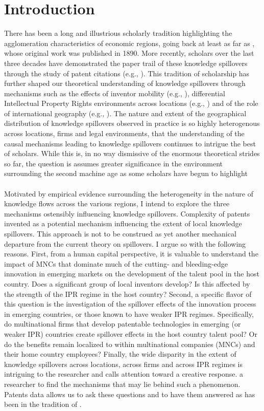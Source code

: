 \documentclass[12pt]{article}
\begin{document}
\section{Introduction}
There has been a long and illustrious scholarly tradition highlighting the agglomeration characteristics of economic regions, going back at least as far as \cite{Marshall1890}, whose original work was published in 1890. More recently, scholars over the last three decades have demonstrated the paper trail of these knowledge spillovers through the study of patent citations (e.g., \cite{Jaffe1993, Almeida1999}). This tradition of scholarship has further shaped our theoretical understanding of knowledge spillovers through mechanisms such as the effects of inventor mobility (e.g., \cite{Almeida1999}), differential Intellectual Property Rights environments across locations (e.g., \cite{Zhao2006}) and of the role of international geography (e.g., \cite{Singh2007}).  The nature and extent of the geographical distribution of knowledge spillovers observed  in practice is so highly heterogenous across locations, firms and legal environments,  that the understanding of the causal mechanisms leading to knowledge spillovers continues to intrigue the best of scholars. While this is, in no way dismissive of  the enormous theoretical strides so far, the question is assumes greater significance in the environment surrounding the second machine age as some scholars have begun to highlight \citep{Mcafee2014} 
\\\\
Motivated by empirical evidence surrounding the heterogeneity in the nature of knowledge flows across the various regions, I intend to explore the three mechanisms ostensibly influencing knowledge spillovers. Complexity of patents invented as a potential mechanism influencing the extent of local knowledge spillovers. This approach is not to be construed as yet another mechanical departure from the current theory on spillovers. I argue so with the following reasons.  First, from a human capital perspective, it is valuable to understand the impact of MNCs that dominate much of the cutting- and bleeding-edge innovation in emerging markets on the development of the talent pool in the host country. Does a significant group of local inventors develop? Is this affected by the strength of the IPR regime in the host country? Second, a specific flavor of this question is the investigation of the spillover effects of the innovation process in emerging countries, or those known to have weaker IPR regimes. Specifically, do multinational firms that develop patentable technologies in emerging (or weaker IPR) countries create spillover effects in the host country talent pool? Or do the benefits remain localized to within multinational companies (MNCs) and their home country employees?  Finally, the wide disparity in the extent of knowledge spillovers across locations, across firms and across IPR regimes is intriguing to the researcher and calls attention toward a creative response.  a researcher to find the mechanisms that may lie behind such a phenomenon. Patents data allows us to ask these questions and to have them answered as has been in the tradition of \cite{Jaffe1993}.
\end{document}

